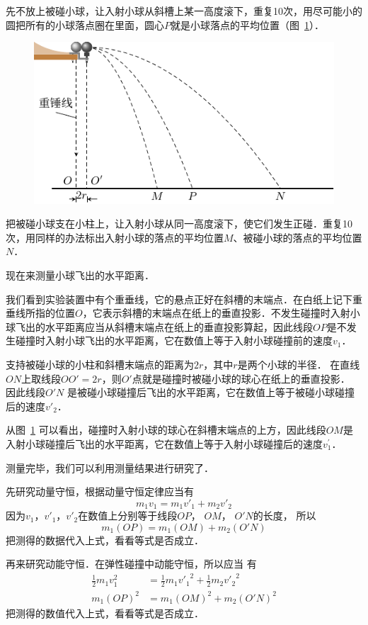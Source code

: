 先不放上被碰小球，让入射小球从斜槽上某一高度滚下，重复10次，用尽可能小的圆把所有的小球落点圈在里面，圆心$P$就是小球落点的平均位置（图~\ref{fig_A_10-19}）．
\begin{figure}[htbp]
    \centering
    \includegraphics{fig/A/10-19.pdf}
    \caption{}\label{fig_A_10-19}
\end{figure}

把被碰小球支在小柱上，让入射小球从同一高度滚下，使它们发生正碰．重复10次，用同样的办法标出入射小球的落点的平均位置$M$、被碰小球的落点的平均位置$N$．

现在来测量小球飞出的水平距离．

我们看到实验装置中有个重垂线，它的悬点正好在斜槽的末端点．在白纸上记下重垂线所指的位置$O$，它表示斜槽的末端点在纸上的垂直投影．不发生碰撞时入射小球飞出的水平距离应当从斜槽末端点在纸上的垂直投影算起，因此线段$OP$是不发生碰撞时入射小球飞出的水平距离，它在数值上等于入射小球碰撞前的速度$v_1$．

支持被碰小球的小柱和斜槽末端点的距离为$2r$，其中$r$是两个小球的半径．
在直线$ON$上取线段$OO'=2r$，则$O'$点就是碰撞时被碰小球的球心在纸上的垂直投影．
因此线段$O'N$ 是被碰小球碰撞后飞出的水平距离，它在数值上等于被碰小球碰撞后的速度$v'_2$．

从图~\ref{fig_A_10-19} 可以看出，碰撞时入射小球的球心在斜槽末端点的上方，因此线段$OM$是入射小球碰撞后飞出的水平距离，它在数值上等于入射小球碰撞后的速度$v_1^{\prime}$．

测量完毕，我们可以利用测量结果进行研究了．

先研究动量守恒，根据动量守恒定律应当有
\[m_1v_1=m_1v'_1+m_2v'_2 \]
因为$v_1 $，$ v'_1 $，$ v'_2$在数值上分别等于线段$OP$， $OM$， $O'N$的长度，
所以
\[m_1(OP)=m_1(OM)+m_2(O'N)\]
把测得的数据代入上式，看看等式是否成立．

再来研究动能守恒．在弹性碰撞中动能守恒，所以应当
有
\[\begin{split}
    \frac{1}{2}m_1v_1^2&=\frac{1}{2}m_1{v'_1}^2+\frac{1}{2}m_2{v'_2}^2\\
    m_1(OP)^2&=m_1(OM)^2+m_2(O'N)^2
\end{split}\]
把测得的数值代入上式，看看等式是否成立．

